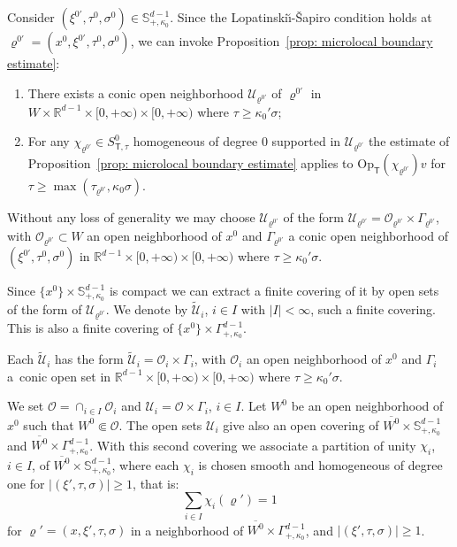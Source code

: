 \documentclass[JEP,XML,SOM,Unicode,published]{cedram}
\theoremstyle{plain}
\theoremstyle{definition}
\def\R{\mathbb{R}}
\newcommand{\LS}{Lopatinski\u{\i}-\v{S}apiro\xspace}
\newcommand{\nhd}{neighborhood\xspace}
\let\k\kappa
\let\y\varrho
\newcommand{\ovl}[1]{\overline{#1}}
\newcommand{\scrO}{\mathscr O}
\newcommand{\U}{\mathscr U}
\newcommand{\Opt}{\ensuremath{\mathrm{Op}_{\scriptscriptstyle{\mathsf{T}}}}}
\newcommand{\Ssct}{S_{{\scriptscriptstyle{\mathsf T}},\tau}}
\begin{document}
Consider $(\xi^{0\prime},\tau^0,\sigma^0) \in \mathbb{S}^{d-1}_{+, \k_0}$.
Since the \LS condition holds at
$\y^{0\prime} = (x^0, \xi^{0\prime},\tau^0,\sigma^0)$, we can invoke
Proposition~\ref{prop: microlocal boundary estimate}:
\begin{enumerate}
\item There exists a conic open neighborhood
$\U_{\y^{0\prime}}$ of $\y^{0\prime}$ in
$W \times \R^{d-1}\times [0,+\infty) \times [0,+\infty)$ where
$\tau \geq \k_0' \sigma$;
\item For any $\chi_{\y^{0\prime}} \in \Ssct^0$ homogeneous of
degree $0$ supported in $\U_{\y^{0\prime}}$ the estimate of
Proposition~\ref{prop: microlocal boundary estimate} applies to $\Opt(\chi_{\y^{0\prime}}) v$ for $\tau
\geq \max (\tau_{\y^{0\prime}} , \k_0\sigma)$.
\end{enumerate}
Without any loss of generality we may choose $\U_{\y^{0\prime}}$ of
the form $\U_{\y^{0\prime}} = \scrO_{\y^{0\prime}} \times
\Gamma_{\y^{0\prime}}$, with $\scrO_{\y^{0\prime}} \subset W$ an open \nhd of
$x^0$ and $\Gamma_{\y^{0\prime}}$ a conic open \nhd of
$(\xi^{0\prime},\tau^0,\sigma^0)$ in $\R^{d-1}\times [0,+\infty) \times
[0,+\infty)$ where $\tau \geq \k_0' \sigma$.

Since $\{ x^0\} \times \mathbb{S}^{d-1}_{+, \k_0}$ is compact we can
extract a finite covering of it by open sets of the form of
$\U_{\y^{0\prime}}$. We denote by
$\tilde{\U}_i$, $i \in I$ with $|I| < \infty$, such a finite covering. This is
also a finite covering of
$\{x^0\} \times \Gamma^{d-1}_{+, \k_0}$.

Each $\tilde{\U}_i$ has the form $\tilde{\U}_i = \scrO_i \times
\Gamma_i$, with $\scrO_i$ an open \nhd of
$x^0$ and $\Gamma_i$ a~conic open set in $\R^{d-1}\times [0,+\infty) \times
[0,+\infty)$ where $\tau \geq \k_0' \sigma$.

We set $\scrO = \cap_{i \in I} \scrO_i$ and
$\U_i = \scrO \times \Gamma_i$, $i \in I$.
Let $W^0$ be an open \nhd of~$x^0$ such that $W^0 \Subset
\scrO$. The open sets $\U_i$
give also an open covering of $\ovl{W^0} \times \mathbb{S}^{d-1}_{+,
\k_0}$ and $\ovl{W^0} \times \Gamma^{d-1}_{+, \k_0}$.
With this second covering we associate a partition of unity
$\chi_i$, $i \in I$, of $\ovl{W^0} \times \mathbb{S}^{d-1}_{+,
\k_0}$,
where each $\chi_i$ is chosen smooth and homogeneous
of degree one for $|(\xi', \tau, \sigma)| \geq 1$, that is:\enlargethispage{-\baselineskip}
\begin{equation*}
\sum_{i \in I}\chi_i(\y')=1
\end{equation*}
for $\y' = (x, \xi', \tau, \sigma)$ in a \nhd
of $\ovl{W^0} \times \Gamma^{d-1}_{+, \k_0}$,
and $|(\xi', \tau, \sigma)| \geq 1$.
\end{document}
